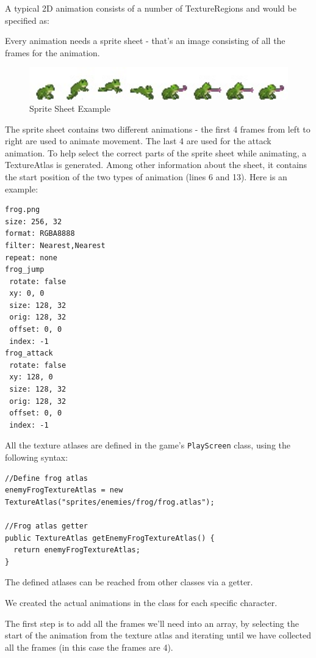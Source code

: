\documentclass[12p]{article}
\begin{document}
A typical 2D animation consists of a number of TextureRegions and would be specified as:


Every animation needs a sprite sheet - that's an image consisting of all the frames for the animation.

\begin{figure}[ht]
  \center
  \includegraphics[width=1\textwidth]{Documentation/frog.jpg}
  \caption{Sprite Sheet Example}
  \label{SpriteSheetExample}
\end{figure}

The sprite sheet contains two different animations - the first 4 frames from left to right are used to animate movement. The last 4 are used for the attack animation. To help select the correct parts of the sprite sheet while animating, a TextureAtlas is generated. Among other information about the sheet, it contains the start position of the two types of animation (lines 6 and 13). Here is an example:

\begin{verbatim}
frog.png
size: 256, 32
format: RGBA8888
filter: Nearest,Nearest
repeat: none
frog_jump
 rotate: false
 xy: 0, 0
 size: 128, 32
 orig: 128, 32
 offset: 0, 0
 index: -1
frog_attack
 rotate: false
 xy: 128, 0
 size: 128, 32
 orig: 128, 32
 offset: 0, 0
 index: -1
\end{verbatim}

All the texture atlases are defined in the game's \texttt{PlayScreen} class, using the following syntax:

\begin{verbatim}
//Define frog atlas
enemyFrogTextureAtlas = new TextureAtlas("sprites/enemies/frog/frog.atlas");

//Frog atlas getter
public TextureAtlas getEnemyFrogTextureAtlas() {
  return enemyFrogTextureAtlas;
}
\end{verbatim}

The defined atlases can be reached from other classes via a getter.

We created the actual animations in the class for each specific character. 

The first step is to add all the frames we'll need into an array, by selecting the start of the animation from the texture atlas and iterating until we have collected all the frames (in this case the frames are 4).
\end{document}
